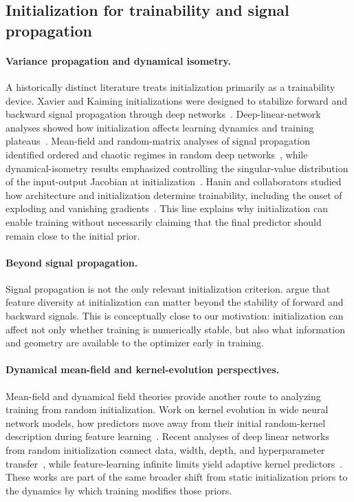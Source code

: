 \documentclass{article}
\begin{document}
\subsection{Initialization for trainability and signal propagation}
\label{app:init-trainability}

\paragraph{Variance propagation and dynamical isometry.}
A historically distinct literature treats initialization primarily as a trainability device.  Xavier and Kaiming initializations were designed to stabilize forward and backward signal propagation through deep networks~\citep{glorot2010understanding,he2015delving}.  Deep-linear-network analyses showed how initialization affects learning dynamics and training plateaus~\citep{saxe2014exact}.  Mean-field and random-matrix analyses of signal propagation identified ordered and chaotic regimes in random deep networks~\citep{poole2016exponential,schoenholz2017deep}, while dynamical-isometry results emphasized controlling the singular-value distribution of the input-output Jacobian at initialization~\citep{pennington2017resurrecting,chen2018dynamical,xiao2018dynamical}.  Hanin and collaborators studied how architecture and initialization determine trainability, including the onset of exploding and vanishing gradients~\citep{hanin2018start,hanin2018gradients}.  This line explains why initialization can enable training without necessarily claiming that the final predictor should remain close to the initial prior.

\paragraph{Beyond signal propagation.}
Signal propagation is not the only relevant initialization criterion.  \citep{blumenfeld2020beyond} argue that feature diversity at initialization can matter beyond the stability of forward and backward signals.  This is conceptually close to our motivation: initialization can affect not only whether training is numerically stable, but also what information and geometry are available to the optimizer early in training.

\paragraph{Dynamical mean-field and kernel-evolution perspectives.}
Mean-field and dynamical field theories provide another route to analyzing training from random initialization.  Work on kernel evolution in wide neural network models, how predictors move away from their initial random-kernel description during feature learning~\citep{bordelon2023self,bordelon2024finite}.  Recent analyses of deep linear networks from random initialization connect data, width, depth, and hyperparameter transfer~\citep{bordelon2025deep}, while feature-learning infinite limits yield adaptive kernel predictors~\citep{lauditi2025adaptive}.  These works are part of the same broader shift from static initialization priors to the dynamics by which training modifies those priors.
\end{document}

